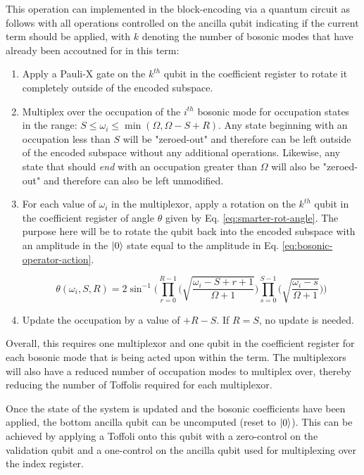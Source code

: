 This operation can implemented in the block-encoding via a quantum circuit as follows with all operations controlled on the ancilla qubit indicating if the current term should be applied, with $k$ denoting the number of bosonic modes that have already been accoutned for in this term:
\begin{enumerate}
    \item Apply a Pauli-X gate on the $k^{th}$ qubit in the coefficient register to rotate it completely outside of the encoded subspace.
    \item Multiplex over the occupation of the $i^{th}$ bosonic mode for occupation states in the range: $S \leq \omega_i \leq \min(\Omega, \Omega - S + R)$. Any state beginning with an occupation less than $S$ will be "zeroed-out" and therefore can be left outside of the encoded subspace without any additional operations. Likewise, any state that should \textit{end} with an occupation greater than $\Omega$ will also be "zeroed-out" and therefore can also be left unmodified.
    \item For each value of $\omega_i$ in the multiplexor, apply a rotation on the $k^{th}$ qubit in the coefficient register of angle $\theta$ given by Eq. \ref{eq:smarter-rot-angle}. The purpose here will be to rotate the qubit back into the encoded subspace with an amplitude in the $\ket{0}$ state equal to the amplitude in Eq. \ref{eq:bosonic-operator-action}. 

    \begin{equation}
        \label{eq:smarter-rot-angle}
        \theta(\omega_i, S, R) = 2 \sin^{-1}{\Big(\prod_{r=0}^{R-1} \big( \sqrt{\frac{\omega_i - S + r + 1}{\Omega + 1}} \big) \prod_{s=0}^{S-1} \big( \sqrt{\frac{\omega_i - s}{\Omega + 1}} \big)\Big)}
    \end{equation}

    \item Update the occupation by a value of $+ R - S$. If $R = S$, no update is needed.
\end{enumerate}

Overall, this requires one multiplexor and one qubit in the coefficient register for each bosonic mode that is being acted upon within the term.
The multiplexors will also have a reduced number of occupation modes to multiplex over, thereby reducing the number of Toffolis required for each multiplexor.

Once the state of the system is updated and the bosonic coefficients have been applied, the bottom ancilla qubit can be uncomputed (reset to $\ket{0}$).
This can be achieved by applying a Toffoli onto this qubit with a zero-control on the validation qubit and a one-control on the ancilla qubit used for multiplexing over the index register.

